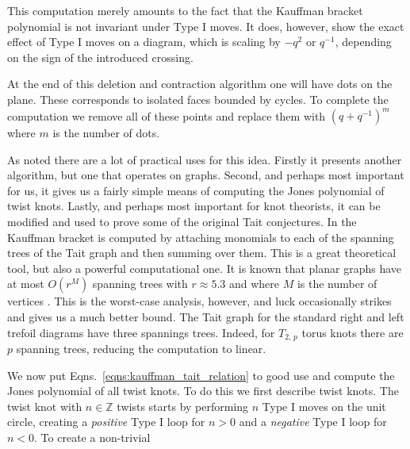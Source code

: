 \documentclass{article}
\theoremstyle{plain}
\begin{document}
        This computation merely amounts to the fact that the Kauffman
        bracket polynomial is not invariant under Type I moves. It does,
        however, show the exact effect of Type I moves on a diagram, which
        is scaling by $-q^{2}$ or $q^{-1}$, depending on the sign of the
        introduced crossing.
        \par\hfill\par
        At the end of this deletion and contraction algorithm one will have
        dots on the plane. These corresponds to isolated faces bounded
        by cycles. To complete the computation we remove all of these
        points and replace them with $(q+q^{-1})^{m}$ where $m$ is the
        number of dots.
        \par\hfill\par
        As noted there are a lot of practical uses for this idea. Firstly
        it presents another algorithm, but one that operates on graphs.
        Second, and perhaps most important for us, it gives us a fairly
        simple means of computing the Jones polynomial of twist knots.
        Lastly, and perhaps most important for knot theorists, it can be
        modified and used to prove some of the original Tait conjectures.
        In \cite{ThistlethwaiteSpanningTree} the Kauffman bracket is
        computed by attaching monomials to each of the spanning trees of
        the Tait graph and then summing over them. This is a great
        theoretical tool, but also a powerful computational one.
        It is known that planar graphs have at most
        $O(r^{M})$ spanning trees with $r\approx{5.3}$ and where $M$ is the
        number of vertices \cite{NumberOfSpanningTrees}. This is the
        worst-case analysis, however, and luck occasionally strikes and
        gives us a much better bound. The Tait graph for the standard
        right and left trefoil diagrams have three spannings trees. Indeed,
        for $T_{2,\,p}$ torus knots there are $p$ spanning trees, reducing
        the computation to linear.
        \par\hfill\par
        We now put Eqns.~\ref{eqns:kauffman_tait_relation} to good use
        and compute the Jones polynomial of all twist knots. To do this
        we first describe twist knots. The twist knot with $n\in\mathbb{Z}$
        twists starts by performing $n$ Type I moves on the unit circle,
        creating a \textit{positive} Type I loop for $n>0$ and a
        \textit{negative} Type I loop for $n<0$. To create a non-trivial
\end{document}
